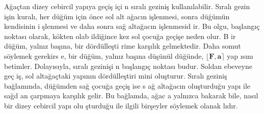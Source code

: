 \documentclass[a4paper,10pt]{article}
\begin{document}

A\u{g}a\c{c}tan dizey cebircil yap\i ya ge\-\c{c}i\c{s} i\-\c{c}i%
n s\i ral{\i} gezini\c{s} kullan\i labilir. S\i ral{\i} ge\-zi\-n%
i\c{s}in kural{\i}, her d\"u\u{g}\"um i\-\c{c}in \"on\-ce sol alt%
a\u{g}ac{\i}n i\c{s}lenmesi, sonra d\"u\u{g}\"um\"un kendisinin i%
\c{s}lenmesi ve daha sonra sa\u{g} alta\u{g}ac\i n i\c{s}lenmesid%
ir. Bu olgu, ba\c{s}lang\i \c{c} noktas{\i} olarak, k\"okten olab%
ildi\u{g}ince kez sol \c{c}ocu\u{g}a ge\c{c}i\c{s}e neden olur. B%
ir d\"u\u{g}\"um, yaln{\i}z ba\c{s}\i na, bir d\"ord\"ulle\c{s}ti%
rime kar\c{s}\i l\i k gelmektedir. Daha somut s\"oylemek gerekirs%
e, bir d\"u\u{g}\"um, yaln{\i}z ba\c{s}{\i}na d\"u\-\c{s}\"un\"ul%
d\"u\u{g}\"unde, $ \lfloor \mathbf{F} , \mathbf{a} \rceil $ ya\-p%
\i s\i n{\i} betimler. Dolay\i s{\i}yla, s\i ral{\i} gezini\c{s}i%
n ba\c{s}lang\i \c{c} noktas{\i} budur. Soldan ebe\-veyne ge\c{c}%
i\c{s}, sol alta\u{g}a\c{c}taki yap\i n\i n d\"ord\"ulle\c{s}tiri%
mini olu\c{s}turur. S{\i}ra\-l{\i} gezini\c{s} ba\u{g}lam\i nda, %
d\"u\u{g}\"umden sa\u{g} \c{c}o\-cu\u{g}a ge\-\c{c}i\c{s} i\-se s%
a\u{g} alta\u{g}ac\i n olu\c{s}turdu\u{g}u yap{\i} i\-le sa\u{g}d%
an \c{c}arpmaya kar\c{s}\i l\i k gelir. Bu ba\u{g}lamda, a\u{g}ac%
a yaln\i zca bakarak bile, nas\i l bir dizey cebircil yap{\i} olu%
\c{s}turdu\u{g}u ile ilgili bir\c{s}eyler s\"oy\-lemek o\-la\-nak%
l\i d\i r. %
\end{document}
